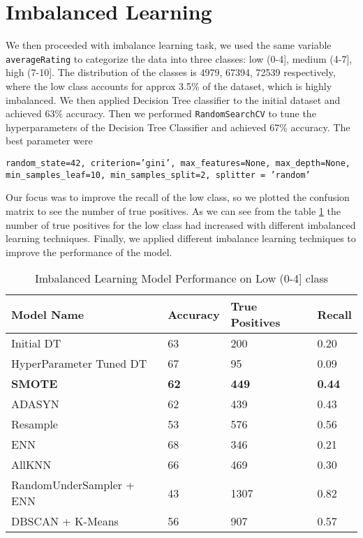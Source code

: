 \section{Imbalanced Learning}
We then proceeded with imbalance learning task, we used the same variable \texttt{averageRating} to categorize the data into three classes:
low (0-4], medium (4-7], high (7-10]. The distribution of the classes is 4979, 67394, 72539 respectively, where the low class accounts for 
approx 3.5\% of the dataset, which is highly imbalanced. 
We then applied Decision Tree classifier to the initial dataset and achieved 63\% accuracy. 
 Then we performed \texttt{RandomSearchCV} to tune the hyperparameters of the Decision Tree Classifier and achieved 67\% accuracy. 
 The best parameter were
 \begin{center}
    \texttt{random\_state=42, criterion='gini', max\_features=None, max\_depth=None, min\_samples\_leaf=10, min\_samples\_split=2, splitter = 'random'} 
 \end{center}

 Our focus was to improve the recall of the low class, so we plotted the confusion matrix to see the number of true positives. 
 As we can see from the table \ref{tab:Imbalance_Learning} 
 the number of true positives for the low class had increased with different imbalanced learning techniques.
 Finally, we applied different imbalance learning techniques to improve the performance of the model.

\begin{table}[]
\centering
\begin{tabular}{|l|l|l|l|}
\hline
Model Name & Accuracy & True Positives & Recall \\ \hline
Initial DT & 63 & 200 & 0.20 \\ \hline
HyperParameter Tuned DT & 67 & 95 & 0.09 \\ \hline
\textbf{SMOTE} & \textbf{62} & \textbf{449} & \textbf{0.44} \\ \hline
ADASYN & 62 & 439 & 0.43 \\ \hline
Resample & 53 & 576 & 0.56 \\ \hline
ENN & 68 & 346 & 0.21 \\ \hline
AllKNN & 66 & 469 & 0.30 \\ \hline
RandomUnderSampler + ENN & 43 & 1307 & 0.82 \\ \hline
DBSCAN + K-Means & 56 & 907 & 0.57 \\ \hline
\end{tabular}
\caption{Imbalanced Learning Model Performance on Low (0-4{]} class}
\label{tab:Imbalance_Learning}
\end{table}

